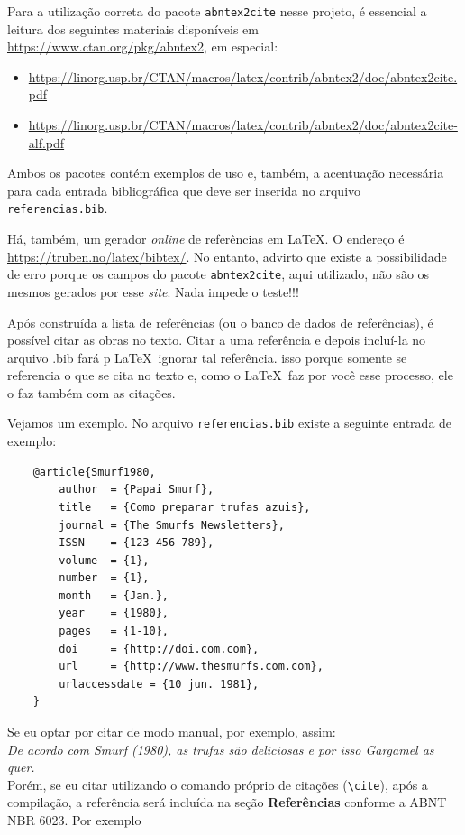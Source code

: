 \documentclass[a4paper,12pt,oneside,openright,extrafontsizes,openbib]{memoir}
\begin{document}
{{Para a utilização correta do pacote \verb|abntex2cite| nesse projeto, é essencial a leitura dos seguintes materiais disponíveis em \url{https://www.ctan.org/pkg/abntex2}, em especial:

\begin{itemize}
    \item \url{https://linorg.usp.br/CTAN/macros/latex/contrib/abntex2/doc/abntex2cite.pdf}
    \item \url{https://linorg.usp.br/CTAN/macros/latex/contrib/abntex2/doc/abntex2cite-alf.pdf}
\end{itemize}

Ambos os pacotes contém exemplos de uso e, também, a acentuação necessária para cada entrada bibliográfica que deve ser inserida no arquivo \verb|referencias.bib|.

Há, também, um gerador \textit{online} de referências em \LaTeX. O endereço é \url{https://truben.no/latex/bibtex/}. No entanto, advirto que existe a possibilidade de erro porque os campos do pacote \verb|abntex2cite|, aqui utilizado, não são os mesmos gerados por esse \textit{site}. Nada impede o teste!!!

Após construída a lista de referências (ou o banco de dados de referências), é possível citar as obras no texto. Citar  a uma referência e depois incluí-la no arquivo .bib fará p \LaTeX\ ignorar tal referência. isso porque somente se referencia o que se cita no texto e, como o \LaTeX\ faz por você esse processo, ele o faz também com as citações.

Vejamos um exemplo. No arquivo \verb|referencias.bib| existe a seguinte entrada de exemplo:

\begin{verbatim}
	@article{Smurf1980,
		author  = {Papai Smurf},
		title   = {Como preparar trufas azuis},
		journal = {The Smurfs Newsletters},
		ISSN    = {123-456-789},
		volume  = {1},
		number  = {1},
		month   = {Jan.},
		year    = {1980},
		pages   = {1-10},
		doi     = {http://doi.com.com},
		url     = {http://www.thesmurfs.com.com},
		urlaccessdate = {10 jun. 1981},
	}
\end{verbatim}

Se eu optar por citar de modo manual, por exemplo, assim: 
\ \\

\textit{De acordo com Smurf (1980), as trufas são deliciosas e por isso Gargamel as quer.}
\ \\
Porém, se eu citar utilizando o comando próprio de citações (\verb|\cite|), após a compilação, a referência será incluída na seção \textbf{Referências} conforme a ABNT NBR 6023. Por exemplo

}}
\end{document}
